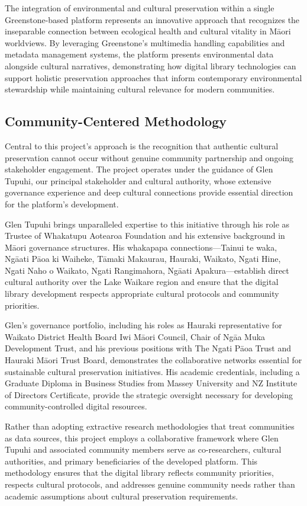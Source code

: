 The integration of environmental and cultural preservation within a single Greenstone-based platform represents an innovative approach that recognizes the inseparable connection between ecological health and cultural vitality in M\=aori worldviews. By leveraging Greenstone's multimedia handling capabilities and metadata management systems, the platform presents environmental data alongside cultural narratives, demonstrating how digital library technologies can support holistic preservation approaches that inform contemporary environmental stewardship while maintaining cultural relevance for modern communities.

\subsection{Community-Centered Methodology}

Central to this project's approach is the recognition that authentic cultural preservation cannot occur without genuine community partnership and ongoing stakeholder engagement. The project operates under the guidance of Glen Tupuhi, our principal stakeholder and cultural authority, whose extensive governance experience and deep cultural connections provide essential direction for the platform's development.

Glen Tupuhi brings unparalleled expertise to this initiative through his role as Trustee of Whakatupu Aotearoa Foundation and his extensive background in M\=aori governance structures. His whakapapa connections—Tainui te waka, Ng\=aati P\=aoa ki Waiheke, T\=amaki Makaurau, Hauraki, Waikato, Ngati Hine, Ngati Naho o Waikato, Ngati Rangimahora, Ng\=aati Apakura—establish direct cultural authority over the Lake Waikare region and ensure that the digital library development respects appropriate cultural protocols and community priorities.

Glen's governance portfolio, including his roles as Hauraki representative for Waikato District Health Board Iwi M\=aori Council, Chair of Ng\=aa Muka Development Trust, and his previous positions with The Ngati P\=aoa Trust and Hauraki M\=aori Trust Board, demonstrates the collaborative networks essential for sustainable cultural preservation initiatives. His academic credentials, including a Graduate Diploma in Business Studies from Massey University and NZ Institute of Directors Certificate, provide the strategic oversight necessary for developing community-controlled digital resources.

Rather than adopting extractive research methodologies that treat communities as data sources, this project employs a collaborative framework where Glen Tupuhi and associated community members serve as co-researchers, cultural authorities, and primary beneficiaries of the developed platform. This methodology ensures that the digital library reflects community priorities, respects cultural protocols, and addresses genuine community needs rather than academic assumptions about cultural preservation requirements.

